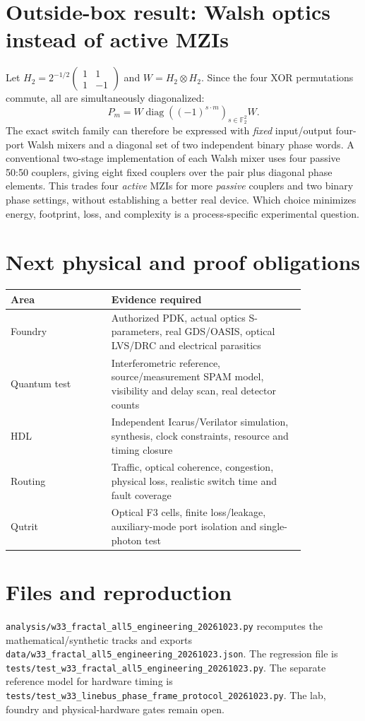 \documentclass[10pt]{article}
\begin{document}
\section{Outside-box result: Walsh optics instead of active MZIs}
Let $H_2=2^{-1/2}
\left(\begin{smallmatrix}1&1\\1&-1\end{smallmatrix}\right)$
and $W=H_2\otimes H_2$. Since the four XOR
permutations commute, all are simultaneously
diagonalized:
\[
P_m=W\operatorname{diag}
\left((-1)^{s\cdot m}\right)_{s\in\mathbb{F}_2^2}W.
\]
The exact switch family can therefore be expressed
with \emph{fixed} input/output four-port Walsh
mixers and a diagonal set of two independent
binary phase words. A conventional
two-stage implementation of each Walsh mixer
uses four passive 50:50 couplers, giving eight
fixed couplers over the pair plus diagonal
phase elements. This trades four \emph{active}
MZIs for more \emph{passive} couplers and two
binary phase settings, without establishing
a better real device. Which choice minimizes
energy, footprint, loss, and complexity is a
process-specific experimental question.

\section{Next physical and proof obligations}
\begin{longtable}{p{0.29\linewidth}p{0.54\linewidth}}
\toprule
Area & Evidence required\\\midrule
Foundry & Authorized PDK, actual optics S-parameters,
real GDS/OASIS, optical LVS/DRC and electrical parasitics\\
Quantum test & Interferometric reference, source/measurement
SPAM model, visibility and delay scan, real detector counts\\
HDL & Independent Icarus/Verilator simulation,
synthesis, clock constraints, resource and timing closure\\
Routing & Traffic, optical coherence, congestion,
physical loss, realistic switch time and fault coverage\\
Qutrit & Optical F3 cells, finite loss/leakage,
auxiliary-mode port isolation and single-photon test\\
\bottomrule
\end{longtable}
\section{Files and reproduction}
\texttt{analysis/w33\_fractal\_all5\_engineering\_20261023.py}
recomputes the mathematical/synthetic tracks and exports
\texttt{data/w33\_fractal\_all5\_engineering\_20261023.json}.
The regression file is
\texttt{tests/test\_w33\_fractal\_all5\_engineering\_20261023.py}.
The separate reference model for hardware timing
is \texttt{tests/test\_w33\_linebus\_phase\_frame\_protocol\_20261023.py}.
The lab, foundry and physical-hardware gates remain open.
\end{document}
